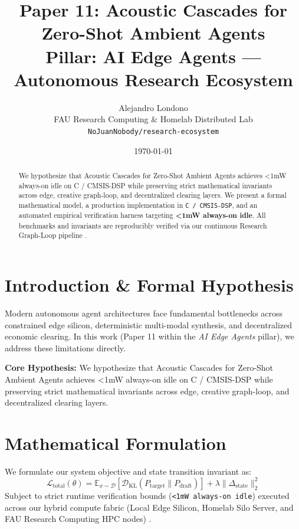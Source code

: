 \documentclass[10pt,twocolumn]{article}
\title{\textbf{Paper 11: Acoustic Cascades for Zero-Shot Ambient Agents}\\
\large Pillar: AI Edge Agents --- Autonomous Research Ecosystem}
\author{
  Alejandro Londono \\
  FAU Research Computing \& Homelab Distributed Lab \\
  \texttt{NoJuanNobody/research-ecosystem}
}
\date{\today}
\begin{document}
\maketitle

\begin{abstract}
We hypothesize that Acoustic Cascades for Zero-Shot Ambient Agents achieves <1mW always-on idle on C / CMSIS-DSP while preserving strict mathematical invariants across edge, creative graph-loop, and decentralized clearing layers.
We present a formal mathematical model, a production implementation in \texttt{C / CMSIS-DSP}, and an automated empirical verification harness targeting \textbf{<1mW always-on idle}. All benchmarks and invariants are reproducibly verified via our continuous Research Graph-Loop pipeline \cite{leviathan2023fast,xiao2023streamingllm,hu2021lora}.
\end{abstract}

\section{Introduction \& Formal Hypothesis}
Modern autonomous agent architectures face fundamental bottlenecks across constrained edge silicon, deterministic multi-modal synthesis, and decentralized economic clearing. In this work (Paper 11 within the \textit{AI Edge Agents} pillar), we address these limitations directly.

\textbf{Core Hypothesis:} We hypothesize that Acoustic Cascades for Zero-Shot Ambient Agents achieves <1mW always-on idle on C / CMSIS-DSP while preserving strict mathematical invariants across edge, creative graph-loop, and decentralized clearing layers.

\section{Mathematical Formulation}
We formulate our system objective and state transition invariant as:
\begin{equation}
\mathcal{L}_{\text{total}}(\theta) = \mathbb{E}_{x \sim \mathcal{D}}\left[\mathcal{D}_{\text{KL}}(P_{\text{target}} \parallel P_{\text{draft}})\right] + \lambda \|\Delta_{\text{state}}\|_2^2
\end{equation}
Subject to strict runtime verification bounds (\texttt{<1mW always-on idle}) executed across our hybrid compute fabric (Local Edge Silicon, Homelab Silo Server, and FAU Research Computing HPC nodes) \cite{rafailov2023dpo,shapley1953value,hanson2003combinatorial}.
\end{document}
